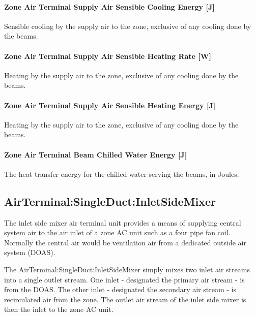 \paragraph{Zone Air Terminal Supply Air Sensible Cooling Energy {[}J{]}}\label{zone-air-terminal-supply-air-sensible-cooling-energy-j}

Sensible cooling by the supply air to the zone, exclusive of any cooling done by the beams.

\paragraph{Zone Air Terminal Supply Air Sensible Heating Rate {[}W{]}}\label{zone-air-terminal-supply-air-sensible-heating-rate-w}

Heating by the supply air to the zone, exclusive of any cooling done by the beams.

\paragraph{Zone Air Terminal Supply Air Sensible Heating Energy {[}J{]}}\label{zone-air-terminal-supply-air-sensible-heating-energy-j}

Heating by the supply air to the zone, exclusive of any cooling done by the beams.

\paragraph{Zone Air Terminal Beam Chilled Water Energy {[}J{]}}\label{zone-air-terminal-beam-chilled-water-energy-j}

The heat transfer energy for the chilled water serving the beams, in Joules.

\subsection{AirTerminal:SingleDuct:InletSideMixer}\label{airterminalsingleductinletsidemixer}

The inlet side mixer air terminal unit provides a means of supplying central system air to the air inlet of a zone AC unit such as a four pipe fan coil. Normally the central air would be ventilation air from a dedicated outside air system (DOAS).

The AirTerminal:SingleDuct:InletSideMixer simply mixes two inlet air streams into a single outlet stream. One inlet - designated the primary air stream - is from the DOAS. The other inlet - designated the secondary air stream - is recirculated air from the zone. The outlet air stream of the inlet side mixer is then the inlet to the zone AC unit.

